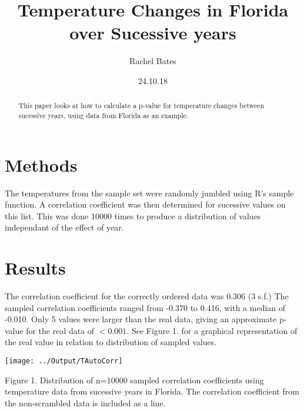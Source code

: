 \documentclass[12pt]{article}
\title{Temperature Changes in Florida over Sucessive years}
\author{Rachel Bates}
\date{24.10.18}
\begin{document}
  \maketitle

  \begin{abstract}
  This paper looks at how to calculate a p-value for temperature changes between sucessive years, using data from Florida as an example.  
  \end{abstract}

  \section{Methods}
  The temperatures from the sample set were randomly jumbled using R's sample function. A correlation coefficient was then determined for sucessive values on this list. This was done 10000 times to produce a distribution of values independant of the effect of year.

  \section{Results}
  The correlation coefficient for the correctly ordered data was 0.306 (3 s.f.)
  The sampled correlation coefficients ranged from -0.370 to 0.416, with a median of -0.010. Only 5 values were larger than the real data, giving an approximate p-value for the real data of $< 0.001$. 
  See Figure 1. for a graphical representation of the real value in relation to distribution of sampled values.

  \texttt{[image: ../Output/TAutoCorr]}

  Figure 1. Distribution of n=10000 sampled correlation coefficients using temperature data from sucessive years in Florida. The correlation coefficient from the non-scrambled data is included as a line.
\end{document}
